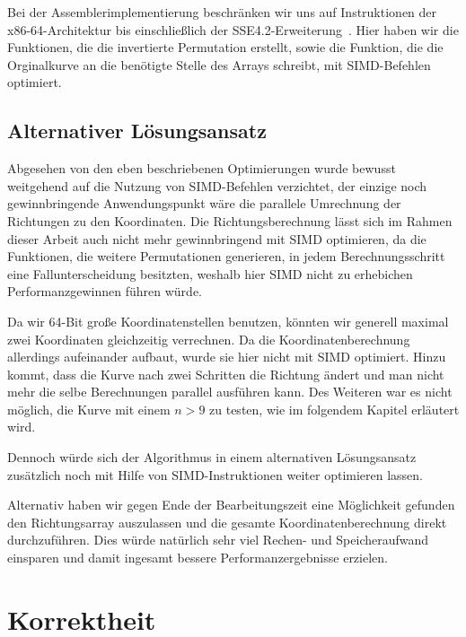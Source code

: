 \documentclass[course=asp]{aspdoc}
\begin{document}
Bei der Assemblerimplementierung beschr\"anken wir uns auf Instruktionen der x86-64-Architektur bis einschlie\ss lich der SSE4.2-Erweiterung~\cite{intel2020man}. Hier haben wir die Funktionen, die die invertierte Permutation erstellt, sowie die Funktion, die die Orginalkurve an die ben\"otigte Stelle des Arrays schreibt, mit SIMD-Befehlen optimiert. 


\subsection{Alternativer L\"osungsansatz} \label{Alternativer L\"osungsansatz}

Abgesehen von den eben beschriebenen Optimierungen wurde bewusst weitgehend auf die Nutzung von SIMD-Befehlen verzichtet, der einzige noch gewinnbringende Anwendungspunkt w\"are die parallele Umrechnung der Richtungen zu den Koordinaten. Die Richtungsberechnung l\"asst sich im Rahmen dieser Arbeit auch nicht mehr gewinnbringend mit SIMD optimieren, da die Funktionen, die weitere Permutationen generieren, in jedem Berechnungsschritt eine Fallunterscheidung besitzten, weshalb hier SIMD nicht zu erhebichen Performanzgewinnen f\"uhren w\"urde. 

Da wir 64-Bit gro\ss e Koordinatenstellen benutzen, k\"onnten wir generell maximal zwei Koordinaten gleichzeitig verrechnen. Da die Koordinatenberechnung allerdings aufeinander aufbaut, wurde sie hier nicht mit SIMD optimiert. Hinzu kommt, dass die Kurve nach zwei Schritten die Richtung \"andert und man nicht mehr die selbe Berechnungen parallel ausf\"uhren kann. Des Weiteren war es nicht m\"oglich, die Kurve mit einem $n > 9$ zu testen, wie im folgendem Kapitel erl\"autert wird.

Dennoch w\"urde sich der Algorithmus in einem alternativen L\"osungsansatz zus\"atzlich noch mit Hilfe von SIMD-Instruktionen weiter optimieren lassen.  

Alternativ haben wir gegen Ende der Bearbeitungszeit eine M\"oglichkeit gefunden den Richtungsarray auszulassen und die gesamte Koordinatenberechnung direkt durchzuf\"uhren. Dies w\"urde nat\"urlich sehr viel Rechen- und Speicheraufwand einsparen und damit ingesamt bessere Performanzergebnisse erzielen.

\newpage

\section{Korrektheit} \label{Korrektheit} %
\end{document}
